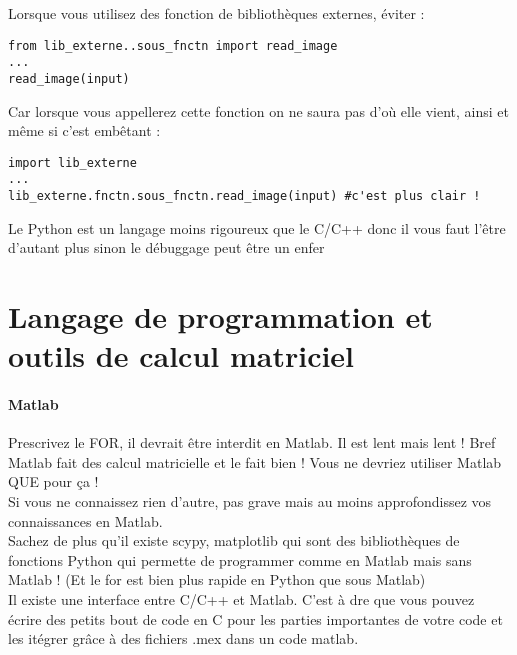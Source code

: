 Lorsque vous utilisez des fonction de bibliothèques externes, éviter : \\

\begin{lstlisting}[style=pythonsty]
from lib_externe..sous_fnctn import read_image
...
read_image(input)
\end{lstlisting}
Car lorsque vous appellerez cette fonction on ne saura pas d'où elle vient, ainsi et même si 
c'est embêtant : \\

\begin{lstlisting}[style=pythonsty]
import lib_externe
...
lib_externe.fnctn.sous_fnctn.read_image(input) #c'est plus clair !
\end{lstlisting}
Le Python est un langage moins rigoureux que le C/C++ donc il vous faut l'être d'autant plus
 sinon le débuggage peut être un enfer 




\section{Langage de programmation et outils de calcul matriciel}



\paragraph{Matlab}

Prescrivez le FOR, il devrait être interdit en Matlab. Il est lent mais lent ! Bref Matlab 
fait des calcul matricielle et le fait bien ! Vous ne devriez utiliser Matlab QUE pour ça !\\

Si vous ne connaissez rien d'autre, pas grave mais au moins approfondissez vos connaissances 
en Matlab.\\

Sachez de plus qu'il existe scypy, matplotlib  qui sont des bibliothèques de fonctions Python 
qui permette de programmer comme en Matlab mais sans Matlab ! (Et le for est bien plus rapide 
en Python que sous Matlab)\\

Il existe une interface entre C/C++ et Matlab. C'est à dre que vous pouvez écrire des petits bout de code en C
pour les parties importantes de votre code et les itégrer grâce à des fichiers .mex dans un code matlab.

